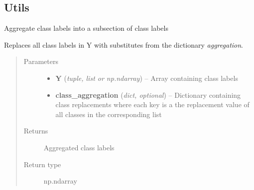 \documentclass[letterpaper,10pt,english]{sphinxmanual}
\begin{document}
\subsection{Utils}
\label{classification:module-flamingo.classification.utils}\label{classification:utils}

\begin{fulllineitems}
\label{classification:flamingo.classification.utils.aggregate_classes}
Aggregate class labels into a subsection of class labels

Replaces all class labels in Y with substitutes from the
dictionary \emph{aggregation}.
\begin{quote}\begin{description}
\item[{Parameters}] \leavevmode\begin{itemize}
\item {} 
\textbf{Y} (\emph{tuple, list or np.ndarray}) -- Array containing class labels

\item {} 
\textbf{class\_aggregation} (\emph{dict, optional}) -- Dictionary containing class replacements where each key
is a the replacement value of all classes in the
corresponding list

\end{itemize}

\item[{Returns}] \leavevmode
Aggregated class labels

\item[{Return type}] \leavevmode
np.ndarray

\end{description}\end{quote}

\end{fulllineitems}

\end{document}
